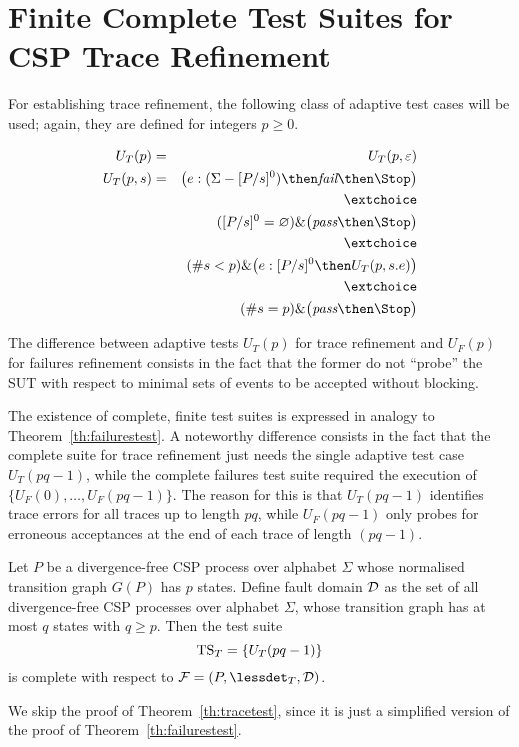 \section{Finite Complete Test Suites for CSP Trace Refinement}
\label{sec:finitecomplete}

For establishing trace refinement, the following class of adaptive test cases will be used; again, they are defined for integers $p \ge 0$.


\begin{eqnarray}
U_T(p) & = & U_T(p,\varepsilon)
\\
U_T(p,s) & = & \big( e:(\Sigma - [P/s]^0) \then \efail\then \Stop \big)
\label{eq:uta}
\\ & & \extchoice \nonumber
\\ & & ([P/s]^0 = \varnothing)    \&   \big( \epass \then \Stop \big)
\label{eq:utb}
\\ & & \extchoice \nonumber
\\ & & (\#s < p) \& \big( e:[P/s]^0 \then U_T(p,s.e) \big)
\label{eq:utc}
\\ & & \extchoice \nonumber
\\ & & (\#s = p) \& \big( \epass\then \Stop  \big)
\label{eq:utd}
\end{eqnarray}


The difference between adaptive tests $U_T(p)$ for trace refinement and
$U_F(p)$ for failures refinement consists in the fact that the former do not ``probe''
the SUT with respect to minimal sets of events to be accepted without blocking. 

The existence of complete, finite test suites is expressed in analogy to Theorem~\ref{th:failurestest}. A noteworthy difference consists in the fact that
the complete suite for trace refinement just needs the single adaptive test case 
$U_T(pq-1)$, while the complete failures test suite required the execution of 
$\{ U_F(0),\dots,U_F(pq-1)\}$. The reason for this is that $U_T(pq-1)$ identifies trace
errors for all traces up to length $pq$, while $U_F(pq-1)$ only probes for erroneous
acceptances at the end of each trace of length $(pq -1)$.

\begin{theorem}\label{th:tracetest}
Let $P$ be a divergence-free CSP process over alphabet $\Sigma$ 
whose normalised transition graph $G(P)$ has $p$ states. Define fault domain ${\cal D}$ as
the set of all divergence-free CSP processes over alphabet $\Sigma$, whose transition graph
has at most $q$ states with $q \ge p$. 
Then the test suite 
\[
{\text{TS}}_T = \{ U_T(pq-1)   \}
\]
is complete with respect to ${\cal F} = (P,\lessdet_T,{\cal D})$.
\xbox
\end{theorem}

We skip the proof of Theorem~\ref{th:tracetest}, since it is just a simplified version of 
the proof of Theorem~\ref{th:failurestest}.











